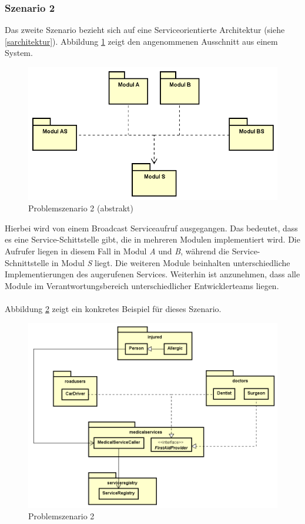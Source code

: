 \documentclass[11pt, 
ngerman,
doublespacing,
chapterinoneline, %
consistentlayout, %
]{scrartcl}
\begin{document}
\subsubsection{Szenario 2}\label{prob2}
Das zweite Szenario bezieht sich auf eine Serviceorientierte Architektur (siehe \ref{sarchitektur}).
Abbildung \ref{fig:problem2} zeigt den angenommenen Ausschnitt aus einem System. 
\begin{figure}[h]
  \centering
  \includegraphics[scale=0.7]{pics/problemS2Abstrakt.png}
  \caption{Problemszenario 2 (abstrakt)}
  \label{fig:problem2}
\end{figure}
Hierbei wird von einem Broadcast Serviceaufruf ausgegangen. Das bedeutet, dass es eine Service-Schittstel\-le gibt, die in mehreren Modulen implementiert wird. Die Aufrufer liegen in diesem Fall in Modul \emph{A} und \emph{B}, während die Service-Schnittstelle in Modul \emph{S} liegt. Die weiteren Module beinhalten unterschiedliche Implementierungen des augerufenen Services. Weiterhin ist anzunehmen, dass alle Module im Verantwortungsbereich unterschiedlicher Entwickler\-teams liegen.\\\\
Abbildung \ref{fig:problem2Konkret} zeigt ein konkretes Beispiel für dieses Szenario.
\begin{figure}[h]
  \centering
  \includegraphics[scale=0.5]{pics/problemS2Konkret.png}
  \caption{Problemszenario 2}
  \label{fig:problem2Konkret}
\end{figure}
\end{document}
